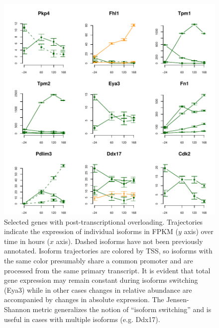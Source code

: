 \documentclass[12pt]{amsart}
\theoremstyle{definition}
\begin{document}
\newpage

\begin{figure}[!ht] 
    \includegraphics{pdfs/splice_overloaded}
    \caption[Selected genes with post-transcriptional
    overloading]{Selected genes with post-transcriptional
      overloading. Trajectories indicate the expression of individual
      isoforms in FPKM ($y$ axis) over time in hours ($x$
      axis). Dashed isoforms have not been previously
      annotated. Isoform trajectories are colored by TSS, so isoforms
      with the same color presumably share a common promoter and are
      processed from the same primary transcript. It is evident that
      total gene expression may remain constant during isoforms
      switching (Eya3) while in other cases changes in relative
      abundance are accompanied by changes in absolute expression. 
The Jensen-Shannon metric generalizes the notion of ``isoform
switching'' and is useful in cases with multiple isoforms
(e.g. Ddx17).    
  \label{splice_overloaded}}
\end{figure}
\end{document}
